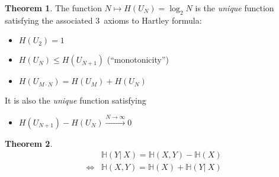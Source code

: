 \documentclass[a4paper]{article}
\newcommand\op[2][P]{\mathbb{#1}\left(#2\right)}
\newcommand\cond[3][P]{\mathbb{#1}\left(#2 \left|\:#3\right)\right.}
\theoremstyle{definition}
\newtheorem{thm}{Theorem}
\begin{document}
\begin{thm}
  The function $N \mapsto H(U_N) = \log_2{N}$ is the \emph{unique} function satisfying the associated 3~axioms to Hartley formula:
  \begin{itemize}
    \itemsep0pt
    \item $H(U_2) = 1$
    \item $H(U_N) \leq H(U_{N+1})$ (\enquote{monotonicity})
    \item $H(U_{M\cdot N}) = H(U_M) + H(U_N)$
  \end{itemize}
  It is also the \emph{unique} function satisfying
  \begin{itemize}
    \itemsep0pt
    \item $H(U_{N+1}) - H(U_N) \xrightarrow{N \rightarrow \infty} 0$
  \end{itemize}
\end{thm}

\begin{thm}
  \begin{align*}
    & \cond[H] YX = \op[H]{X,Y} - \op[H]{X} \\
    \Leftrightarrow{ } & \op[H]{X,Y} = \op[H]{X} + \cond[H] YX
  \end{align*}
\end{thm}
\end{document}

